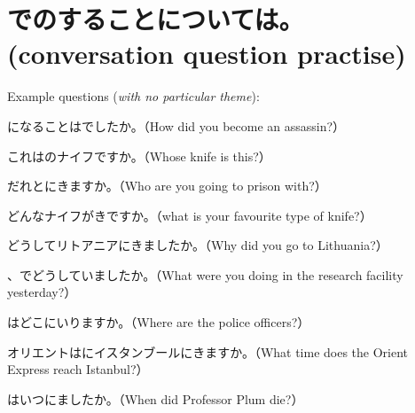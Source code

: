 \documentclass[44pt, oneside]{article}   	%
\begin{document}
\section*{\protect {}でのすることについては。(conversation question practise)}

Example questions (\textit{with no particular theme}):

になることはでしたか。（How did you become an assassin?）

これはのナイフですか。（Whose knife is this?）

だれとにきますか。（Who are you going to prison with?）

どんなナイフがきですか。（what is your favourite type of knife?）

どうしてリトアニアにきましたか。（Why did you go to Lithuania?）

、でどうしていましたか。（What were you doing in the research facility yesterday?）

はどこにいりますか。（Where are the police officers?）

オリエントはにイスタンブールにきますか。（What time does the Orient Express reach Istanbul?）

はいつにましたか。（When did Professor Plum die?）
\end{document}

